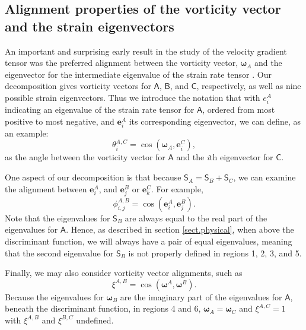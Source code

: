 \documentclass[preprint,amssymb,amsmath,aip,cha]{revtex4-1}
\begin{document}
\subsection{Alignment properties of the vorticity vector and the strain eigenvectors}
\label{sect.vortstrain}
An important and surprising early result in the study of the velocity gradient tensor was the preferred alignment between the vorticity vector, $\boldsymbol{\omega}_{A}$ and the eigenvector for the intermediate eigenvalue of the strain rate tensor \citep{kerr85,ashurst87,jimenez92}. Our decomposition gives vorticity vectors for $\mathsf{A}$, $\mathsf{B}$, and $\mathsf{C}$, respectively, as well as nine possible strain eigenvectors. Thus we introduce the notation that with $e_{i}^{A}$ indicating an eigenvalue of the strain rate tensor for $\mathsf{A}$, ordered from most positive to most negative, and $\mathbf{e}^{A}_{i}$ its corresponding eigenvector, we can define, as an example:
\begin{equation}
\theta^{A,C}_{i} = \cos(\boldsymbol{\omega}_{A}, \mathbf{e}^{C}_{i}),
\end{equation}
as the angle between the vorticity vector for $\mathsf{A}$ and the \emph{i}th eigenvector for $\mathsf{C}$. 

One aspect of our decomposition is that because $\mathsf{S}_{A} = \mathsf{S}_{B} + \mathsf{S}_{C}$, we can examine the alignment between $\mathbf{e}_{i}^{A}$, and  $\mathbf{e}_{j}^{B}$ or $\mathbf{e}_{k}^{C}$. For example,
\begin{equation}
\phi_{i,j}^{A,B} = \cos(\mathbf{e}_{i}^{A},\mathbf{e}_{j}^{B}).
\end{equation}
Note that the eigenvalues for $\mathsf{S}_{B}$ are always equal to the real part of the eigenvalues for $\mathsf{A}$. Hence, as described in section \ref{sect.physical}, when above the discriminant function, we will always have a pair of equal eigenvalues, meaning that the second eigenvalue for $\mathsf{S}_{B}$ is not properly defined in regions 1, 2, 3, and 5.

Finally, we may also consider vorticity vector alignments, such as
\begin{equation}
\xi^{A,B} = \cos(\boldsymbol{\omega}^{A},\boldsymbol{\omega}^{B}).
\end{equation}
Because the eigenvalues for $\boldsymbol{\omega}_{B}$ are the imaginary part of the eigenvalues for $\mathsf{A}$, beneath the discriminant function, in regions 4 and 6, $\boldsymbol{\omega}_{A} = \boldsymbol{\omega}_{C}$ and $\xi^{A,C} = 1$ with $\xi^{A,B}$ and $\xi^{B,C}$ undefined.
\end{document}

